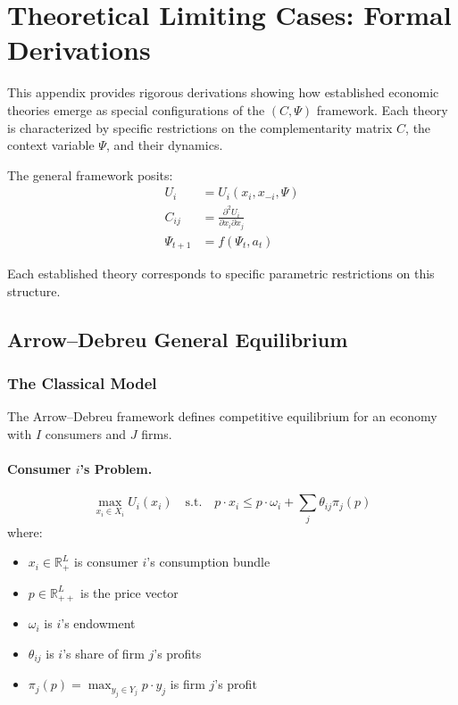 \documentclass[12pt,a4paper]{article}
\makeatletter
\newcommand{\AlphExtended}[1]{%
  \ifcase\value{#1}\or A\or B\or C\or D\or E\or F\or G\or H\or I\or J\or K\or L\or M%
  \or N\or O\or P\or Q\or R\or S\or T\or U\or V\or W\or X\or Y\or Z%
  \or AA\or AB\or AC\or AD\or AE\or AF\or AG\or AH\or AI\or AJ\or AK\or AL\or AM%
  \or AN\or AO\or AP\or AQ\or AR\or AS\or AT\or AU\or AV\or AW\or AX\or AY\or AZ%
  \else\@ctrerr\fi
}
\makeatother
\begin{document}
\appendix
\renewcommand{\thesection}{\AlphExtended{section}}

\section{Theoretical Limiting Cases: Formal Derivations}
\label{app:limitingcases}

This appendix provides rigorous derivations showing how established economic theories
emerge as special configurations of the $(C, \Psi)$ framework.
Each theory is characterized by specific restrictions on the complementarity matrix $C$,
the context variable $\Psi$, and their dynamics.

The general framework posits:
\begin{align}
  U_i &= U_i(x_i, x_{-i}, \Psi) \label{eq:generalutility} \\
  C_{ij} &= \frac{\partial^2 U_i}{\partial x_i \partial x_j} \label{eq:generalcomplementarity} \\
  \Psi_{t+1} &= f(\Psi_t, a_t) \label{eq:generalcontext}
\end{align}

Each established theory corresponds to specific parametric restrictions on this structure.

\subsection{Arrow--Debreu General Equilibrium}
\label{app:arrowdebreu}

\subsubsection{The Classical Model}

The Arrow--Debreu framework \citep{arrowdeb} defines competitive equilibrium
for an economy with $I$ consumers and $J$ firms.

\paragraph{Consumer $i$'s Problem.}
\begin{equation}
  \max_{x_i \in X_i} U_i(x_i) \quad \text{s.t.} \quad p \cdot x_i \leq p \cdot \omega_i + \sum_j \theta_{ij} \pi_j(p)
\end{equation}
where:
\begin{itemize}
  \item $x_i \in \mathbb{R}^L_+$ is consumer $i$'s consumption bundle
  \item $p \in \mathbb{R}^L_{++}$ is the price vector
  \item $\omega_i$ is $i$'s endowment
  \item $\theta_{ij}$ is $i$'s share of firm $j$'s profits
  \item $\pi_j(p) = \max_{y_j \in Y_j} p \cdot y_j$ is firm $j$'s profit
\end{itemize}
\end{document}
